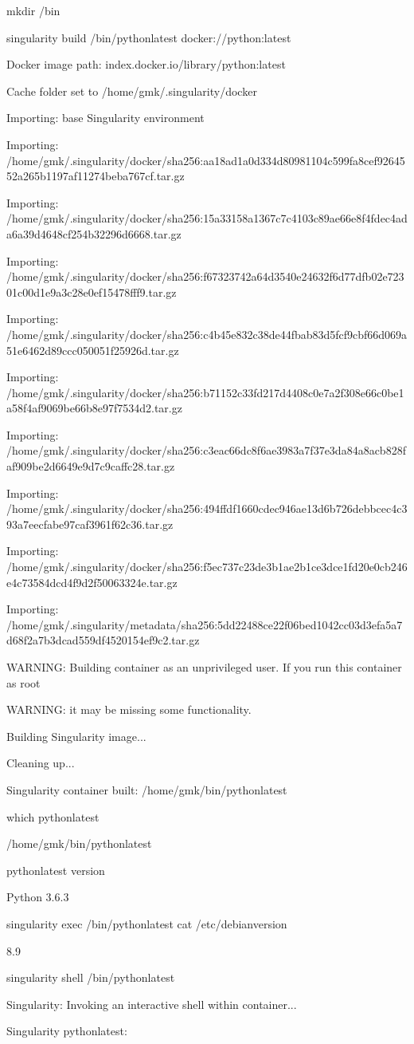 \documentclass[letterpaper,10pt,english]{sphinxmanual}
\begin{document}
%
\begin{sphinxVerbatim}[commandchars=\\\{\}]
\PYGZdl{} mkdir \PYGZti{}/bin

\PYGZdl{} singularity build \PYGZti{}/bin/python\PYGZhy{}latest docker://python:latest

Docker image path: index.docker.io/library/python:latest

Cache folder set to /home/gmk/.singularity/docker

Importing: base Singularity environment

Importing: /home/gmk/.singularity/docker/sha256:aa18ad1a0d334d80981104c599fa8cef9264552a265b1197af11274beba767cf.tar.gz

Importing: /home/gmk/.singularity/docker/sha256:15a33158a1367c7c4103c89ae66e8f4fdec4ada6a39d4648cf254b32296d6668.tar.gz

Importing: /home/gmk/.singularity/docker/sha256:f67323742a64d3540e24632f6d77dfb02e72301c00d1e9a3c28e0ef15478fff9.tar.gz

Importing: /home/gmk/.singularity/docker/sha256:c4b45e832c38de44fbab83d5fcf9cbf66d069a51e6462d89ccc050051f25926d.tar.gz

Importing: /home/gmk/.singularity/docker/sha256:b71152c33fd217d4408c0e7a2f308e66c0be1a58f4af9069be66b8e97f7534d2.tar.gz

Importing: /home/gmk/.singularity/docker/sha256:c3eac66dc8f6ae3983a7f37e3da84a8acb828faf909be2d6649e9d7c9caffc28.tar.gz

Importing: /home/gmk/.singularity/docker/sha256:494ffdf1660cdec946ae13d6b726debbcec4c393a7eecfabe97caf3961f62c36.tar.gz

Importing: /home/gmk/.singularity/docker/sha256:f5ec737c23de3b1ae2b1ce3dce1fd20e0cb246e4c73584dcd4f9d2f50063324e.tar.gz

Importing: /home/gmk/.singularity/metadata/sha256:5dd22488ce22f06bed1042cc03d3efa5a7d68f2a7b3dcad559df4520154ef9c2.tar.gz

WARNING: Building container as an unprivileged user. If you run this container as root

WARNING: it may be missing some functionality.

Building Singularity image...

Cleaning up...

Singularity container built: /home/gmk/bin/python\PYGZhy{}latest


\PYGZdl{} which python\PYGZhy{}latest

/home/gmk/bin/python\PYGZhy{}latest


\PYGZdl{} python\PYGZhy{}latest \PYGZhy{}\PYGZhy{}version

Python 3.6.3


\PYGZdl{} singularity exec \PYGZti{}/bin/python\PYGZhy{}latest cat /etc/debian\PYGZus{}version

8.9

\PYGZdl{} singularity shell \PYGZti{}/bin/python\PYGZhy{}latest

Singularity: Invoking an interactive shell within container...


Singularity python\PYGZhy{}latest:\PYGZti{}\PYGZgt{}
\end{sphinxVerbatim}
\end{document}
